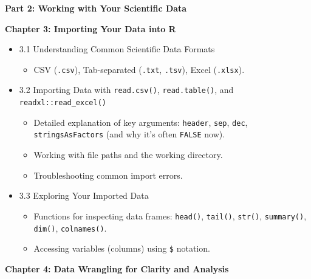 \documentclass[
  letterpaper,
  DIV=11,
  numbers=noendperiod]{scrreprt}
\providecommand{\tightlist}{%
  \setlength{\itemsep}{0pt}\setlength{\parskip}{0pt}}\usepackage{longtable,booktabs,array}
\begin{document}
\textbf{Part 2: Working with Your Scientific Data}

\textbf{Chapter 3: Importing Your Data into R}

\begin{itemize}
\tightlist
\item
  3.1 Understanding Common Scientific Data Formats

  \begin{itemize}
  \tightlist
  \item
    CSV (\texttt{.csv}), Tab-separated (\texttt{.txt}, \texttt{.tsv}),
    Excel (\texttt{.xlsx}).
  \end{itemize}
\item
  3.2 Importing Data with \texttt{read.csv()}, \texttt{read.table()},
  and \texttt{readxl::read\_excel()}

  \begin{itemize}
  \tightlist
  \item
    Detailed explanation of key arguments: \texttt{header},
    \texttt{sep}, \texttt{dec}, \texttt{stringsAsFactors} (and why it's
    often \texttt{FALSE} now).
  \item
    Working with file paths and the working directory.
  \item
    Troubleshooting common import errors.
  \end{itemize}
\item
  3.3 Exploring Your Imported Data

  \begin{itemize}
  \tightlist
  \item
    Functions for inspecting data frames: \texttt{head()},
    \texttt{tail()}, \texttt{str()}, \texttt{summary()}, \texttt{dim()},
    \texttt{colnames()}.
  \item
    Accessing variables (columns) using \texttt{\$} notation.
  \end{itemize}
\end{itemize}

\textbf{Chapter 4: Data Wrangling for Clarity and Analysis}
\end{document}

